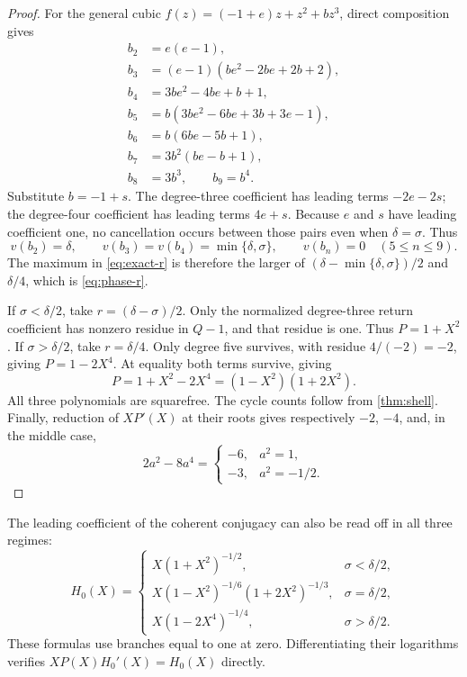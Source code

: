 \documentclass[11pt,letterpaper]{article}
\numberwithin{equation}{section}
\theoremstyle{plain}
\theoremstyle{definition}
\theoremstyle{remark}
\begin{document}
\begin{proof}
For the general cubic $f(z)=(-1+e)z+z^2+bz^3$, direct composition gives
\begin{align}
 b_2&=e(e-1),\nonumber\\
 b_3&=(e-1)(be^2-2be+2b+2),\nonumber\\
 b_4&=3be^2-4be+b+1,\nonumber\\
 b_5&=b(3be^2-6be+3b+3e-1),\label{eq:general-cubic}\\
 b_6&=b(6be-5b+1),\nonumber\\
 b_7&=3b^2(be-b+1),\nonumber\\
 b_8&=3b^3,\qquad b_9=b^4.\nonumber
\end{align}
Substitute $b=-1+s$. The degree-three coefficient has leading terms
$-2e-2s$; the degree-four coefficient has leading terms $4e+s$.
Because $e$ and $s$ have leading coefficient one, no cancellation occurs
between those pairs even when $\delta=\sigma$. Thus
\[
 v(b_2)=\delta,\qquad
 v(b_3)=v(b_4)=\min\{\delta,\sigma\},\qquad
 v(b_n)=0\quad(5\le n\le9).
\]
The maximum in \eqref{eq:exact-r} is therefore the larger of
$(\delta-\min\{\delta,\sigma\})/2$ and $\delta/4$, which is
\eqref{eq:phase-r}.

If $\sigma<\delta/2$, take $r=(\delta-\sigma)/2$. Only the
normalized degree-three return coefficient has nonzero residue in $Q-1$,
and that residue is one. Thus $P=1+X^2$.
If $\sigma>\delta/2$, take $r=\delta/4$. Only degree five survives,
with residue $4/(-2)=-2$, giving $P=1-2X^4$.
At equality both terms survive, giving
\[
 P=1+X^2-2X^4=(1-X^2)(1+2X^2).
\]
All three polynomials are squarefree. The cycle counts follow from
\cref{thm:shell}. Finally, reduction of $XP'(X)$ at their roots gives
respectively $-2$, $-4$, and, in the middle case,
\[
 2a^2-8a^4=
 \begin{cases}-6,&a^2=1,\\-3,&a^2=-1/2.\end{cases}
\]
\end{proof}

The leading coefficient of the coherent conjugacy can also be read off in
all three regimes:
\begin{equation}\label{eq:phase-H0}
 H_0(X)=
 \begin{cases}
 X(1+X^2)^{-1/2},&\sigma<\delta/2,\\[2pt]
 X(1-X^2)^{-1/6}(1+2X^2)^{-1/3},&\sigma=\delta/2,\\[2pt]
 X(1-2X^4)^{-1/4},&\sigma>\delta/2.
 \end{cases}
\end{equation}
These formulas use branches equal to one at zero. Differentiating their
logarithms verifies $XP(X)H_0'(X)=H_0(X)$ directly.
\end{document}
